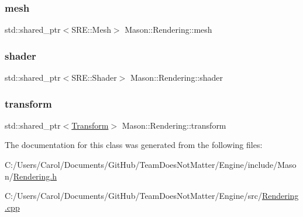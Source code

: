\hypertarget{class_mason_1_1_rendering_a71855a0cbc812640516a7925be451546}{}\label{class_mason_1_1_rendering_a71855a0cbc812640516a7925be451546} 
\subsubsection{\texorpdfstring{mesh}{mesh}}
{\footnotesize\ttfamily std\+::shared\+\_\+ptr$<$S\+R\+E\+::\+Mesh$>$ Mason\+::\+Rendering\+::mesh\hspace{0.3cm}{\ttfamily [protected]}}

\hypertarget{class_mason_1_1_rendering_a32477a9cf3115210280e47e9172ca407}{}\label{class_mason_1_1_rendering_a32477a9cf3115210280e47e9172ca407} 
\subsubsection{\texorpdfstring{shader}{shader}}
{\footnotesize\ttfamily std\+::shared\+\_\+ptr$<$S\+R\+E\+::\+Shader$>$ Mason\+::\+Rendering\+::shader\hspace{0.3cm}{\ttfamily [protected]}}

\hypertarget{class_mason_1_1_rendering_adaca4d8bb739395f32fc4886653ed2f5}{}\label{class_mason_1_1_rendering_adaca4d8bb739395f32fc4886653ed2f5} 
\subsubsection{\texorpdfstring{transform}{transform}}
{\footnotesize\ttfamily std\+::shared\+\_\+ptr$<$\hyperlink{class_mason_1_1_transform}{Transform}$>$ Mason\+::\+Rendering\+::transform\hspace{0.3cm}{\ttfamily [protected]}}



The documentation for this class was generated from the following files\+:\begin{DoxyCompactItemize}
\item 
C\+:/\+Users/\+Carol/\+Documents/\+Git\+Hub/\+Team\+Does\+Not\+Matter/\+Engine/include/\+Mason/\hyperlink{_rendering_8h}{Rendering.\+h}\item 
C\+:/\+Users/\+Carol/\+Documents/\+Git\+Hub/\+Team\+Does\+Not\+Matter/\+Engine/src/\hyperlink{_rendering_8cpp}{Rendering.\+cpp}\end{DoxyCompactItemize}
